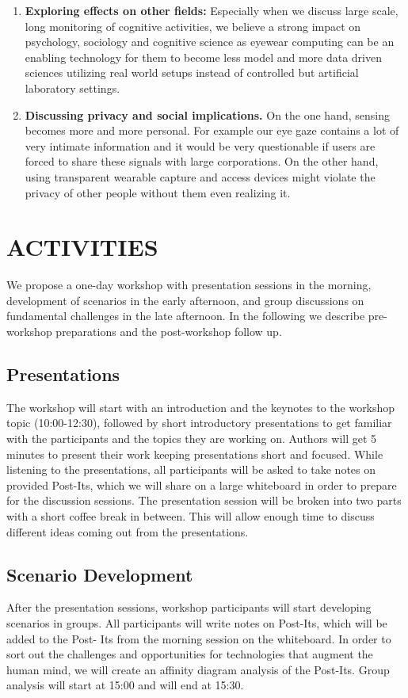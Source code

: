 \documentclass{sigchi-ext}
\begin{document}
\begin{enumerate}
  \item {\bf Exploring effects on other fields:} Especially when we discuss large scale, long monitoring of cognitive activities, we believe a strong impact on psychology, sociology and cognitive science as eyewear computing can be an enabling technology for them to  become less model and more data driven sciences utilizing real world setups instead of controlled but artificial laboratory settings.
  \item {\bf Discussing privacy and social implications.} On the one hand, sensing becomes more and more personal. For example our eye gaze contains a lot of very intimate information and it would be very questionable if users are forced to share these signals with large corporations. On the other hand, using transparent wearable capture and access devices might violate the privacy of other people without them even realizing it.

\end{enumerate}





\section{ACTIVITIES}
We propose a one-day workshop with presentation sessions in the morning, development of scenarios in the early afternoon, and group discussions on fundamental challenges in the late afternoon. In the following we describe pre-workshop preparations and the post-workshop follow up.

\subsection{Presentations}
The workshop will start with an introduction and the keynotes to the workshop topic (10:00-12:30), followed by short introductory presentations to get familiar with the participants and the topics they are working on. Authors will get 5 minutes to present their work keeping presentations short and focused. While listening to the presentations, all participants will be asked to take notes on provided Post-Its, which we will share on a large whiteboard in order to prepare for the discussion sessions.
The presentation session will be broken into two parts with a short coffee break in between. This will allow enough time to discuss different ideas coming out from the presentations.

\subsection{Scenario Development}
After the presentation sessions, workshop participants will start developing scenarios in groups. All participants will write notes on Post-Its, which will be added to the Post- Its from the morning session on the whiteboard. In order to sort out the challenges and opportunities for technologies that augment the human mind, we will create an affinity diagram analysis of the Post-Its. Group analysis will start at 15:00 and will end at 15:30.
\end{document}
